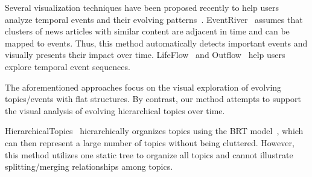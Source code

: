 Several visualization techniques have been proposed recently to help users analyze temporal events and their evolving patterns~\cite{Dou2012,krstajic2013,Luo2012}.
EventRiver~\cite{Luo2012} assumes that clusters of news articles with similar content are adjacent in time and can be mapped to events.
Thus, this method automatically detects important events and visually presents their impact over time.
LifeFlow~\cite{Wongsuphasawat2011} and Outflow~\cite{Wongsuphasawat2012} help users explore temporal event sequences.


The aforementioned approaches focus on the visual exploration of evolving topics/events with flat structures.
By contrast, our method attempts to support the visual analysis of evolving hierarchical topics over time.

HierarchicalTopics~\cite{Dou2013} hierarchically organizes topics using the BRT model~\cite{Blundell2010,Liu2012a}, which can then represent a large number of topics without being cluttered.
However, this method utilizes one static tree to organize all topics and cannot illustrate splitting/merging relationships among topics.

